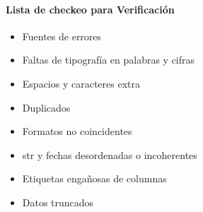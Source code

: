 \paragraph{Lista de checkeo para Verificación}
\begin{itemize}
    \item {Fuentes de errores}
    \item {Faltas de tipografía en palabras y cifras}
    \item {Espacios y caracteres extra}
    \item {Duplicados}
    \item {Formatos no coincidentes}
    \item {\gls{str} y fechas desordenadas o incoherentes}
    \item {Etiquetas engañosas de columnas}
    \item {Datos truncados}
\end{itemize}


\newpage